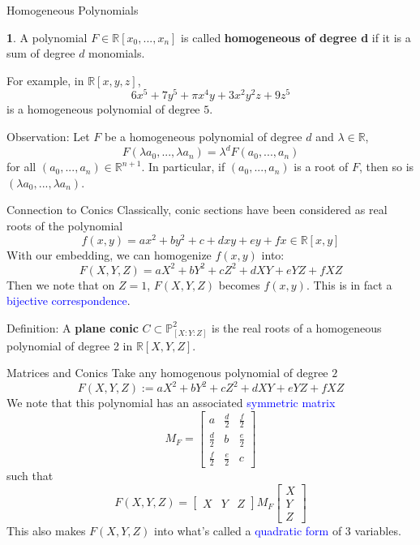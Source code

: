 \documentclass[hyperref, notheorems]{beamer}
\newcommand{\Rbb}{\mathbb{R}}
\newcommand{\Pbb}{\mathbb{P}}
\newcommand{\txtblue}{\textcolor{blue}}
\theoremstyle{definition}
\newtheorem{definition}{\translate{Definition}}
\begin{document}
\begin{frame}{Homogeneous Polynomials}
    
    \begin{definition}
    A polynomial $F \in \Rbb[x_0, ..., x_n]$ is called \textbf{homogeneous of degree d} if it is a sum of degree $d$ monomials.
    \end{definition}
    For example, in $\Rbb[x, y, z]$, 
    \[6x^5 + 7y^5 + \pi x^4y + 3x^2y^2z + 9z^5\]
    is a homogeneous polynomial of degree $5$.
    
    \begin{block}{Observation:}
    Let $F$ be a homogeneous polynomial of degree $d$ and $\lambda \in \Rbb$,
    \[F(\lambda a_0, ..., \lambda a_n) =  \lambda^d F(a_0, ..., a_n)\]
    for all $(a_0, ..., a_n) \in \Rbb^{n+1}$. In particular, if $(a_0, ..., a_n)$ is a root of $F$, then so is $(\lambda a_0, ..., \lambda a_n)$.
    \end{block}
\end{frame}

\begin{frame}{Connection to Conics}
    Classically, conic sections have been considered as real roots of the polynomial
    \[f(x,y) = ax^2 + by^2 + c + dxy + ey + fx \in \Rbb[x, y]\]
    With our embedding, we can homogenize $f(x, y)$ into:
    \[F(X, Y, Z) = aX^2 + bY^2 + cZ^2 + dXY + eYZ + fXZ\]
    Then we note that on $Z = 1$, $F(X, Y, Z)$ becomes $f(x, y)$. This is in fact a \txtblue{bijective correspondence}.
    
    \begin{block}{Definition:}
    A \textbf{plane conic} $C \subset \Pbb^2_{[X:Y:Z]}$ is the real roots of a homogeneous polynomial of degree 2 in $\Rbb[X, Y, Z]$.
    \end{block}
\end{frame}


\begin{frame}{Matrices and Conics}
Take any homogenous polynomial of degree $2$
\[F(X, Y, Z) := aX^2 + bY^2 + cZ^2 + dXY + eYZ + fXZ\]
We note that this polynomial has an associated \txtblue{symmetric matrix}
\[M_F = \begin{bmatrix}
a & \frac{d}{2} & \frac{f}{2}\\
\frac{d}{2} & b & \frac{e}{2}\\
\frac{f}{2} & \frac{e}{2} & c
\end{bmatrix}\]
such that
\[F(X, Y, Z) = \begin{bmatrix} 
X & Y & Z
\end{bmatrix}
M_F
\begin{bmatrix} 
X\\
Y\\
Z
\end{bmatrix}\]
This also makes $F(X, Y, Z)$ into what's called a \txtblue{quadratic form} of 3 variables.
\end{frame}
\end{document}
